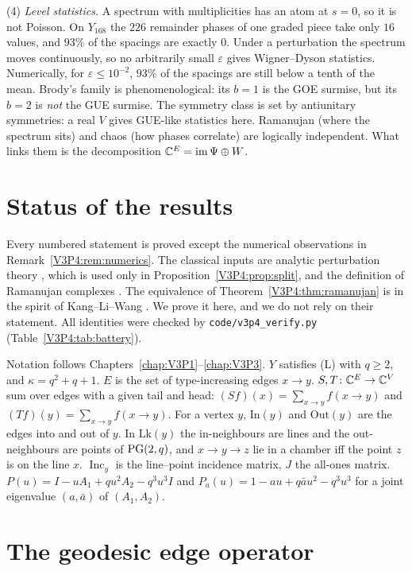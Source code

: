 \begin{chapterabstract}
(4) \emph{Level statistics.} A spectrum with multiplicities has an atom at $s=0$, so it is not
Poisson. On $Y_{168}$ the $226$ remainder phases of one graded piece take only $16$ values,
and $93\%$ of the spacings are exactly $0$. Under a perturbation the spectrum moves
continuously, so no arbitrarily small $\varepsilon$ gives Wigner--Dyson statistics. Numerically,
for $\varepsilon\le10^{-2}$, $93\%$ of the spacings are still below a tenth of the mean.
Brody's family is phenomenological: its $b=1$ is the GOE surmise, but its $b=2$ is \emph{not}
the GUE surmise. The symmetry class is set by antiunitary symmetries: a real $V$ gives
GUE-like statistics here. Ramanujan (where the spectrum sits) and chaos (how phases
correlate) are logically independent. What links them is the decomposition
$\mathbb{C}^{E}=\operatorname{im}\Psi\oplus W$.
\end{chapterabstract}

\section*{Status of the results}

Every numbered statement is proved except the numerical observations in
Remark~\ref{V3P4:rem:numerics}. The classical inputs are analytic perturbation theory
\cite{Kato}, which is used only in Proposition~\ref{V3P4:prop:split}, and the definition of
Ramanujan complexes \cite{LSV05}. The equivalence of Theorem~\ref{V3P4:thm:ramanujan} is in the
spirit of Kang--Li--Wang \cite{KLW10}. We prove it here, and we do not rely on their
statement. All identities were checked by \texttt{code/v3p4\_verify.py}
(Table~\ref{V3P4:tab:battery}).

Notation follows Chapters~\ref{chap:V3P1}--\ref{chap:V3P3}. $Y$ satisfies (L) with $q\ge2$, and $\kappa=q^{2}+q+1$. $E$ is
the set of type-increasing edges $x\to y$. $S,T\colon\mathbb{C}^{E}\to\mathbb{C}^{V}$ sum over edges with a
given tail and head: $(Sf)(x)=\sum_{x\to y}f(x\to y)$ and $(Tf)(y)=\sum_{x\to y}f(x\to y)$. For
a vertex $y$, $\mathrm{In}(y)$ and $\mathrm{Out}(y)$ are the edges into and out of $y$. In
$\mathrm{Lk}(y)$ the in-neighbours are lines and the out-neighbours are points of $\mathrm{PG}(2,q)$,
and $x\to y\to z$ lie in a chamber iff the point $z$ is on the line $x$. $\operatorname{Inc}_y$
is the line--point incidence matrix, $J$ the all-ones matrix. $P(u)=I-uA_1+qu^{2}A_2-q^{3}u^{3}I$
and $P_a(u)=1-au+q\bar au^{2}-q^{3}u^{3}$ for a joint eigenvalue $(a,\bar a)$ of
$(A_1,A_2)$.

\section{The geodesic edge operator}\label{V3P4:sec:LE}

